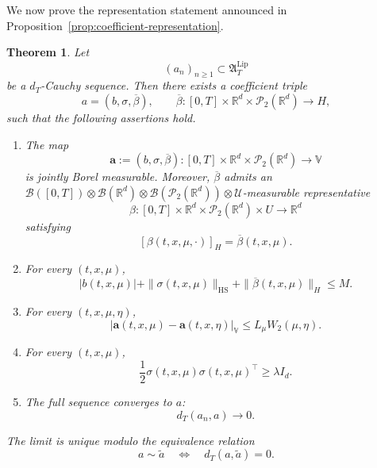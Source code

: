 \documentclass[12pt,oneside, reqno]{amsart}
\newtheorem{theorem}{Theorem}[section]
\numberwithin{equation}{section}
\begin{document}
	
	
	
	We now prove the representation statement announced in
	Proposition~\ref{prop:coefficient-representation}.
	
	
	
	
	\begin{theorem}
		\label{thm:completion-representation}
		Let
		\[
		(a_n)_{n\geq 1}\subset \mathfrak A_T^{\mathrm{Lip}}
		\]
		be a $d_T$-Cauchy sequence. Then there exists a coefficient triple
		\[
		a=(b,\sigma,\overline\beta),
		\qquad
		\overline\beta:
		[0,T]\times\mathbb R^d\times
		\mathcal P_2(\mathbb R^d)\longrightarrow H,
		\]
		such that the following assertions hold.
		
		\begin{enumerate}
			\item[\textnormal{(i)}]
			The map
			\[
			\mathbf a:=(b,\sigma,\overline\beta):
			[0,T]\times\mathbb R^d\times
			\mathcal P_2(\mathbb R^d)
			\longrightarrow\mathbb V
			\]
			is jointly Borel measurable. Moreover, $\overline\beta$ admits an
			$\mathcal B([0,T])\otimes\mathcal B(\mathbb R^d)
			\otimes\mathcal B(\mathcal P_2(\mathbb R^d))
			\otimes\mathcal U$-measurable representative
			\[
			\beta:
			[0,T]\times\mathbb R^d\times
			\mathcal P_2(\mathbb R^d)\times U
			\longrightarrow\mathbb R^d
			\]
			satisfying
			\[
			[\beta(t,x,\mu,\cdot)]_H
			=
			\overline\beta(t,x,\mu).
			\]
			
			\item[\textnormal{(ii)}]
			For every $(t,x,\mu)$,
			\begin{equation}
				\label{eq:completion-uniform-bound}
				|b(t,x,\mu)|
				+
				\|\sigma(t,x,\mu)\|_{\mathrm{HS}}
				+
				\|\overline\beta(t,x,\mu)\|_H
				\leq M.
			\end{equation}
			
			\item[\textnormal{(iii)}]
			For every $(t,x,\mu,\eta)$,
			\begin{equation}
				\label{eq:completion-measure-lipschitz}
				\left|
				\mathbf a(t,x,\mu)-\mathbf a(t,x,\eta)
				\right|_{\mathbb V}
				\leq
				L_\mu W_2(\mu,\eta).
			\end{equation}
			
			\item[\textnormal{(iv)}]
			For every $(t,x,\mu)$,
			\begin{equation}
				\label{eq:completion-ellipticity}
				\frac12
				\sigma(t,x,\mu)\sigma(t,x,\mu)^\top
				\geq
				\lambda I_d.
			\end{equation}
			
			\item[\textnormal{(v)}]
			The full sequence converges to $a$:
			\begin{equation}
				\label{eq:completion-metric-convergence}
				d_T(a_n,a)\longrightarrow 0.
			\end{equation}
		\end{enumerate}
		
		The limit is unique modulo the equivalence relation
		\[
		a\sim\widetilde a
		\quad\Longleftrightarrow\quad
		d_T(a,\widetilde a)=0.
		\]
	\end{theorem}
\end{document}
